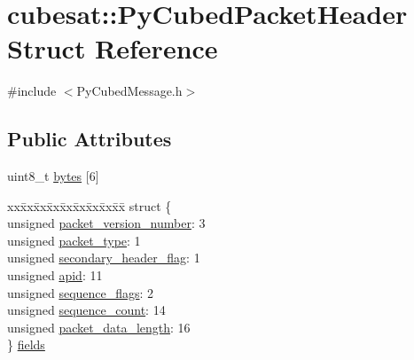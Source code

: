 \hypertarget{structcubesat_1_1PyCubedPacketHeader}{}\section{cubesat\+:\+:Py\+Cubed\+Packet\+Header Struct Reference}
\label{structcubesat_1_1PyCubedPacketHeader}


{\ttfamily \#include $<$Py\+Cubed\+Message.\+h$>$}

\subsection*{Public Attributes}
\begin{DoxyCompactItemize}
\item 
uint8\+\_\+t \hyperlink{structcubesat_1_1PyCubedPacketHeader_ac287aab87779442ad0b7920688586c8c}{bytes} \mbox{[}6\mbox{]}
\item 
\begin{tabbing}
xx\=xx\=xx\=xx\=xx\=xx\=xx\=xx\=xx\=\kill
struct \{\\
\>unsigned \hyperlink{structcubesat_1_1PyCubedPacketHeader_a254cda485af31555d5ebbf1474c5e6c1}{packet\_version\_number}: 3\\
\>unsigned \hyperlink{structcubesat_1_1PyCubedPacketHeader_ab6dad7185cd28250ff37b256774ea6a1}{packet\_type}: 1\\
\>unsigned \hyperlink{structcubesat_1_1PyCubedPacketHeader_a8b449583c7a24ac7cf6b9b29dc63af7a}{secondary\_header\_flag}: 1\\
\>unsigned \hyperlink{structcubesat_1_1PyCubedPacketHeader_a3b3581160add43f191c6a6859a557c5d}{apid}: 11\\
\>unsigned \hyperlink{structcubesat_1_1PyCubedPacketHeader_a4c803d383516d016a6aa0bea290af55e}{sequence\_flags}: 2\\
\>unsigned \hyperlink{structcubesat_1_1PyCubedPacketHeader_a95a52681056d84fcd39c97e949d3ac57}{sequence\_count}: 14\\
\>unsigned \hyperlink{structcubesat_1_1PyCubedPacketHeader_ad1c206c2f7073dad5b97d7bb26e041b8}{packet\_data\_length}: 16\\
\} \hyperlink{structcubesat_1_1PyCubedPacketHeader_aa1bc03af9a992257c0a19b0a5c596001}{fields}\\

\end{tabbing}\end{DoxyCompactItemize}


